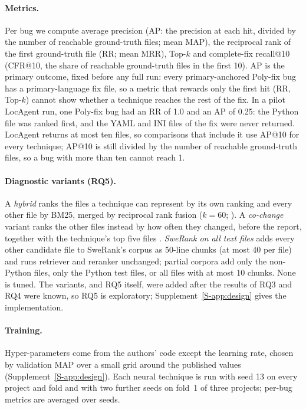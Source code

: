 \documentclass[a4paper,fleqn]{cas-dc}
\begin{document}
\paragraph{Metrics.} Per bug we compute average precision (AP: the precision at
each hit, divided by the number of reachable ground-truth files; mean MAP),
the reciprocal rank of the first ground-truth file (RR; mean MRR), Top-$k$
and complete-fix recall@10 (CFR@10, the share of reachable ground-truth files
in the first 10). AP is the primary outcome, fixed before any full run: every
primary-anchored Poly-fix bug has a primary-language fix file, so a metric
that rewards only the first hit (RR, Top-$k$) cannot show whether a technique
reaches the rest of the fix. In a pilot LocAgent run, one Poly-fix bug had an
RR of 1.0 and an AP of 0.25: the Python file was ranked first, and the YAML
and INI files of the fix were never returned. LocAgent returns at most ten
files, so comparisons that include it use AP@10 for every technique; AP@10 is
still divided by the number of reachable ground-truth files, so a bug with
more than ten cannot reach 1.

\paragraph{Diagnostic variants (RQ5).} A \emph{hybrid} ranks the files a
technique can represent by its own ranking and every other file by BM25,
merged by reciprocal rank fusion ($k{=}60$; \citealp{cormack2009rrf}). A
\emph{co-change} variant ranks the other files instead by how often they
changed, before the report, together with the technique's top five files
\citep{zimmermann2004mining}. \emph{SweRank on all text files} adds every
other candidate file to SweRank's corpus as 50-line chunks (at most 40 per
file) and runs retriever and reranker unchanged; partial corpora add only the
non-Python files, only the Python test files, or all files with at most 10
chunks. None is tuned. The variants, and RQ5 itself, were added after the
results of RQ3 and RQ4 were known, so RQ5 is exploratory;
Supplement~\ref{S-app:design} gives the implementation.

\paragraph{Training.} Hyper-parameters come from the authors' code except the
learning rate, chosen by validation MAP over a small grid around the published
values (Supplement~\ref{S-app:design}). Each neural technique is run with seed 13
on every project and fold and with two further seeds on fold~1 of three
projects; per-bug metrics are averaged over seeds.
\end{document}
